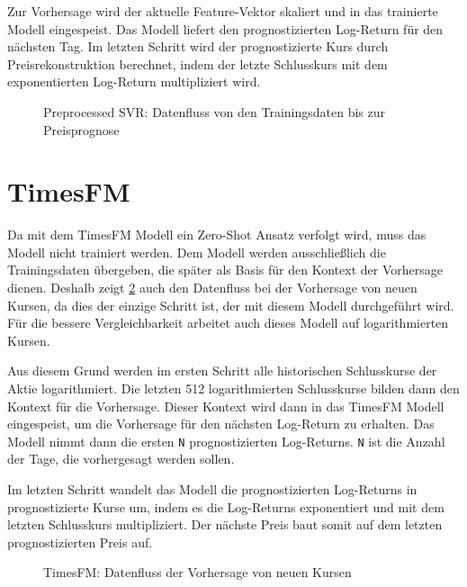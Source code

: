 Zur Vorhersage wird der aktuelle Feature-Vektor skaliert und in das trainierte Modell eingespeist. Das Modell liefert den prognostizierten Log-Return für den nächsten Tag. Im letzten Schritt wird der prognostizierte Kurs durch Preisrekonstruktion berechnet, indem der letzte Schlusskurs mit dem exponentierten Log-Return multipliziert wird.
\begin{figure}[htbp]
    \centering
    
    \caption{Preprocessed SVR: Datenfluss von den Trainingsdaten bis zur Preisprognose}
    \label{fig:svr_prediction_datenfluss}
\end{figure}

\section{TimesFM}\label{sec:timesfm_impl}
Da mit dem TimesFM Modell ein Zero-Shot Ansatz verfolgt wird, muss das Modell nicht trainiert werden. Dem Modell werden ausschließlich die Trainingsdaten übergeben, die später als Basis für den Kontext der Vorhersage dienen. Deshalb zeigt \cref{fig:timesfm_datenfluss} auch den Datenfluss bei der Vorhersage von neuen Kursen, da dies der einzige Schritt ist, der mit diesem Modell durchgeführt wird. Für die bessere Vergleichbarkeit arbeitet auch dieses Modell auf logarithmierten Kursen.

Aus diesem Grund werden im ersten Schritt alle historischen Schlusskurse der Aktie logarithmiert. Die letzten 512 logarithmierten Schlusskurse bilden dann den Kontext für die Vorhersage. Dieser Kontext wird dann in das TimesFM Modell eingespeist, um die Vorhersage für den nächsten Log-Return zu erhalten. Das Modell nimmt dann die ersten \texttt{N} prognostizierten Log-Returns. \texttt{N} ist die Anzahl der Tage, die vorhergesagt werden sollen.

Im letzten Schritt wandelt das Modell die prognostizierten Log-Returns in prognostizierte Kurse um, indem es die Log-Returns exponentiert und mit dem letzten Schlusskurs multipliziert. Der nächste Preis baut somit auf dem letzten prognostizierten Preis auf.
\begin{figure}[htbp]
    \centering
    
    \caption{TimesFM: Datenfluss der Vorhersage von neuen Kursen}
    \label{fig:timesfm_datenfluss}
\end{figure}